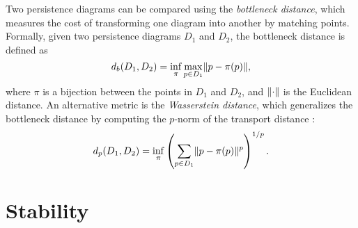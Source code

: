 Two persistence diagrams can be compared using the \emph{bottleneck distance},
which measures the cost of transforming one diagram into another by
matching points. Formally, given two persistence diagrams $D_1$ and $D_2$, the
bottleneck distance is defined as
\begin{equation}
    d_b(D_1, D_2) = \inf_{\pi} \max_{p \in D_1} \lVert p - \pi(p)\rVert,
\end{equation}
where $\pi$ is a bijection between the points in $D_1$ and $D_2$, and
$\lVert\cdot\rVert$ is the Euclidean distance. 
An alternative metric is the \emph{Wasserstein distance}, which generalizes the
bottleneck distance by computing the $p$-norm of the transport distance :
\begin{equation}
    d_p(D_1, D_2) = \inf_{\pi} \left( \sum_{p \in D_1} \lVert p - \pi(p)\rVert^p \right)^{1/p}.
\end{equation}

\section{Stability}

